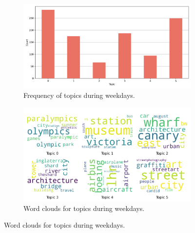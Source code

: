 \documentclass{article}
\theoremstyle{definition}
\theoremstyle{remark}
\begin{document}
\begin{figure}[!h]
    \centering
    \begin{subfigure}{0.45\textwidth}
        \centering
        \includegraphics[width=\linewidth]{figures/places_sense_weekday_tourists.png} 
        \caption{Frequency of topics during weekdays.}
        \label{fig:places_sense_weekday_tourists}
    \end{subfigure}
    \hfill
    \begin{subfigure}{0.5\textwidth}
        \centering
        \includegraphics[width=\linewidth]{figures/topics_weekday_tourists.png} 
        \caption{Word clouds for topics during weekdays.}
        \label{fig:topics_weekday_tourists}
    \end{subfigure}


\end{figure}
\end{document}

